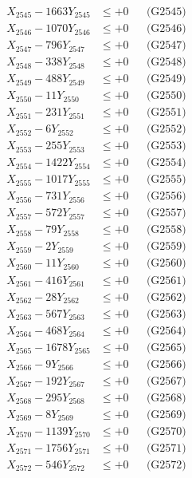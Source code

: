 \documentclass[a4paper,10pt]{article}
\begin{document}
{\begin{align}
X_{2545} - 1663Y_{2545} &\leq +0 && \text{(G2545)} \\
X_{2546} - 1070Y_{2546} &\leq +0 && \text{(G2546)} \\
X_{2547} - 796Y_{2547} &\leq +0 && \text{(G2547)} \\
X_{2548} - 338Y_{2548} &\leq +0 && \text{(G2548)} \\
X_{2549} - 488Y_{2549} &\leq +0 && \text{(G2549)} \\
X_{2550} - 11Y_{2550} &\leq +0 && \text{(G2550)} \\
\allowbreak
X_{2551} - 231Y_{2551} &\leq +0 && \text{(G2551)} \\
X_{2552} - 6Y_{2552} &\leq +0 && \text{(G2552)} \\
X_{2553} - 255Y_{2553} &\leq +0 && \text{(G2553)} \\
X_{2554} - 1422Y_{2554} &\leq +0 && \text{(G2554)} \\
X_{2555} - 1017Y_{2555} &\leq +0 && \text{(G2555)} \\
X_{2556} - 731Y_{2556} &\leq +0 && \text{(G2556)} \\
X_{2557} - 572Y_{2557} &\leq +0 && \text{(G2557)} \\
X_{2558} - 79Y_{2558} &\leq +0 && \text{(G2558)} \\
X_{2559} - 2Y_{2559} &\leq +0 && \text{(G2559)} \\
X_{2560} - 11Y_{2560} &\leq +0 && \text{(G2560)} \\
\allowbreak
X_{2561} - 416Y_{2561} &\leq +0 && \text{(G2561)} \\
X_{2562} - 28Y_{2562} &\leq +0 && \text{(G2562)} \\
X_{2563} - 567Y_{2563} &\leq +0 && \text{(G2563)} \\
X_{2564} - 468Y_{2564} &\leq +0 && \text{(G2564)} \\
X_{2565} - 1678Y_{2565} &\leq +0 && \text{(G2565)} \\
X_{2566} - 9Y_{2566} &\leq +0 && \text{(G2566)} \\
X_{2567} - 192Y_{2567} &\leq +0 && \text{(G2567)} \\
X_{2568} - 295Y_{2568} &\leq +0 && \text{(G2568)} \\
X_{2569} - 8Y_{2569} &\leq +0 && \text{(G2569)} \\
X_{2570} - 1139Y_{2570} &\leq +0 && \text{(G2570)} \\
\allowbreak
X_{2571} - 1756Y_{2571} &\leq +0 && \text{(G2571)} \\
X_{2572} - 546Y_{2572} &\leq +0 && \text{(G2572)} \\

\end{align}}
\end{document}
